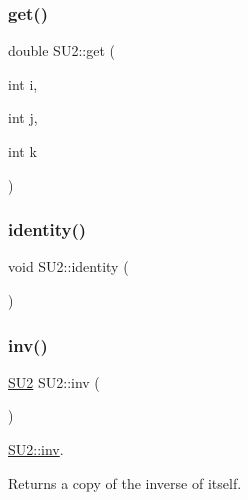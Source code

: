 \subsubsection{\texorpdfstring{get()}{get()}}
{\footnotesize\ttfamily double S\+U2\+::get (\begin{DoxyParamCaption}\item[{int}]{i,  }\item[{int}]{j,  }\item[{int}]{k }\end{DoxyParamCaption})\hspace{0.3cm}{\ttfamily [inline]}}

\mbox{\label{class_s_u2_a17ce46d1d9db179d045602b90b3d5af4}} 
\subsubsection{\texorpdfstring{identity()}{identity()}}
{\footnotesize\ttfamily void S\+U2\+::identity (\begin{DoxyParamCaption}{ }\end{DoxyParamCaption})\hspace{0.3cm}{\ttfamily [inline]}}

\mbox{\label{class_s_u2_a2f7f6ade28078418c8ee97234fff4dd0}} 
\subsubsection{\texorpdfstring{inv()}{inv()}}
{\footnotesize\ttfamily \mbox{\hyperlink{class_s_u2}{S\+U2}} S\+U2\+::inv (\begin{DoxyParamCaption}{ }\end{DoxyParamCaption})\hspace{0.3cm}{\ttfamily [inline]}}



\mbox{\hyperlink{class_s_u2_a2f7f6ade28078418c8ee97234fff4dd0}{S\+U2\+::inv}}. 

\begin{DoxyReturn}{Returns}
a copy of the inverse of itself. 
\end{DoxyReturn}
\mbox{\label{class_s_u2_ad1eebb9f268f569b888f1ae6ab6a7e6c}} 
